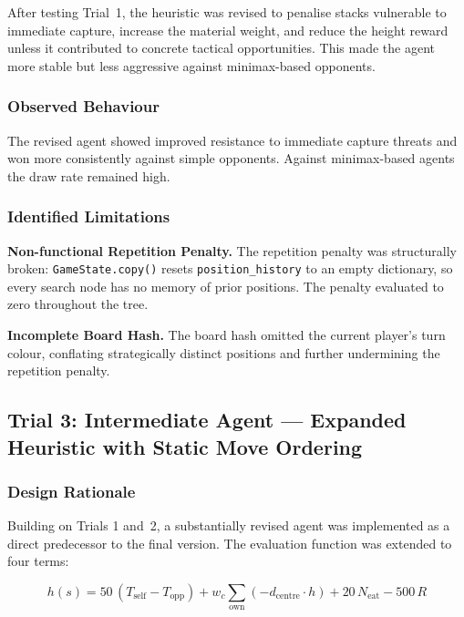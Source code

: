 \documentclass[10.5pt,a4paper]{article}
\begin{document}
After testing Trial~1, the heuristic was revised to penalise stacks vulnerable to immediate capture, increase the material weight, and reduce the height reward unless it contributed to concrete tactical opportunities. This made the agent more stable but less aggressive against minimax-based opponents.

\subsubsection{Observed Behaviour}

The revised agent showed improved resistance to immediate capture threats and won more consistently against simple opponents. Against minimax-based agents the draw rate remained high.

\subsubsection{Identified Limitations}

\textbf{Non-functional Repetition Penalty.}
The repetition penalty was structurally broken: \texttt{GameState.copy()} resets \texttt{position\_history} to an empty dictionary, so every search node has no memory of prior positions. The penalty evaluated to zero throughout the tree.

\textbf{Incomplete Board Hash.}
The board hash omitted the current player's turn colour, conflating strategically distinct positions and further undermining the repetition penalty.

\subsection{Trial 3: Intermediate Agent --- Expanded Heuristic with Static Move Ordering}

\subsubsection{Design Rationale}

Building on Trials 1 and~2, a substantially revised agent was implemented as a direct predecessor to the final version. The evaluation function was extended to four terms:

\begin{equation}
h(s) = 50\,(T_{\text{self}} - T_{\text{opp}}) + w_c \sum_{\text{own}} (-d_{\text{centre}} \cdot h) + 20\,N_{\text{eat}} - 500\,R
\end{equation}
\end{document}
